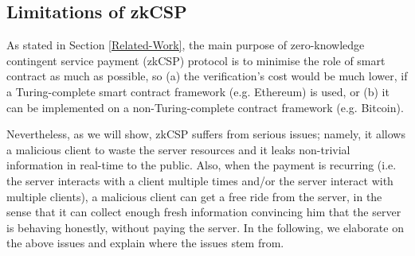 
\subsection{Limitations of zkCSP}

As stated in Section \ref{Related-Work},  the main purpose of zero-knowledge contingent service payment (zkCSP) protocol \cite{CampanelliGGN17}  is to minimise the role of smart contract as much as possible, so  (a) the verification's cost would be much lower, if a Turing-complete smart contract framework (e.g. Ethereum) is used, or (b) it can be implemented on  a non-Turing-complete contract framework (e.g. Bitcoin).   


Nevertheless, as we will show,  zkCSP suffers from  serious issues; namely, it allows a malicious client to waste the server resources and  it leaks non-trivial information in real-time to the public. Also, when the payment is recurring (i.e. the server interacts with a client multiple times and/or the server interact with multiple clients), a malicious client can get a free ride from the server, in the sense that it can collect enough fresh information convincing him that the server is behaving honestly, without paying the server. In the following, we elaborate on the  above issues and explain where the issues stem from.

